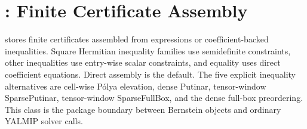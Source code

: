 \chapter{\texorpdfstring{}{pdlmi}: Finite Certificate Assembly}
\label{sec:pdlmi}

 stores finite certificates assembled from  expressions or coefficient-backed  inequalities. Square Hermitian inequality families use semidefinite constraints, other inequalities use entry-wise scalar constraints, and  equality uses direct coefficient equations. Direct assembly is the default. The five explicit inequality alternatives are cell-wise P\'olya elevation, dense Putinar, tensor-window SparsePutinar, tensor-window SparseFullBox, and the dense full-box preordering. This class is the package boundary between Bernstein objects and ordinary YALMIP solver calls.

